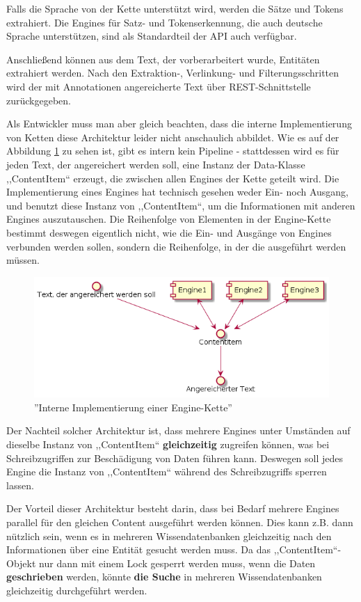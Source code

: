 Falls die Sprache von der Kette unterstützt wird, werden die Sätze und Tokens extrahiert. Die Engines für Satz- und Tokenserkennung, die auch deutsche Sprache unterstützen, sind als Standardteil der API auch verfügbar.

Anschließend können aus dem Text, der vorberarbeitert wurde, Entitäten extrahiert werden. Nach den Extraktion-, Verlinkung- und Filterungsschritten wird der mit Annotationen angereicherte Text über REST-Schnittstelle zurückgegeben.

Als Entwickler muss man aber gleich beachten, dass die interne Implementierung von Ketten diese Architektur leider nicht anschaulich abbildet. Wie es auf der Abbildung \ref{fig:REALPIPELINE} zu sehen ist, gibt es intern kein Pipeline - stattdessen wird es für jeden Text, der angereichert werden soll, eine Instanz der Data-Klasse ,,ContentItem`` erzeugt, die zwischen allen Engines der Kette geteilt wird. Die Implementierung eines Engines hat technisch gesehen weder Ein- noch Ausgang, und benutzt diese Instanz von ,,ContentItem``, um die Informationen mit anderen Engines auszutauschen. Die Reihenfolge von Elementen in der Engine-Kette bestimmt deswegen eigentlich nicht, wie die Ein- und Ausgänge von Engines verbunden werden sollen, sondern die Reihenfolge, in der die ausgeführt werden müssen.

\begin{figure}[ht]
\centering
\includegraphics[width=\textwidth]{Bilder/realarch.png}
\caption{''Interne Implementierung einer Engine-Kette''}
\label{fig:REALPIPELINE}
\end{figure}
Der Nachteil solcher Architektur ist, dass mehrere Engines unter Umständen auf dieselbe Instanz von ,,ContentItem`` \textbf{gleichzeitig} zugreifen können, was bei Schreibzugriffen zur Beschädigung von Daten führen kann. Deswegen soll jedes Engine die Instanz von ,,ContentItem`` während des Schreibzugriffs sperren lassen.

Der Vorteil dieser Architektur besteht darin, dass bei Bedarf mehrere Engines parallel für den gleichen Content ausgeführt werden können. Dies kann z.B. dann nützlich sein, wenn es in mehreren Wissendatenbanken gleichzeitig nach den Informationen über eine Entität gesucht werden muss. Da das ,,ContentItem``-Objekt nur dann mit einem Lock gesperrt werden muss, wenn die Daten \textbf{geschrieben} werden, könnte \textbf{die Suche} in mehreren Wissendatenbanken gleichzeitig durchgeführt werden.


